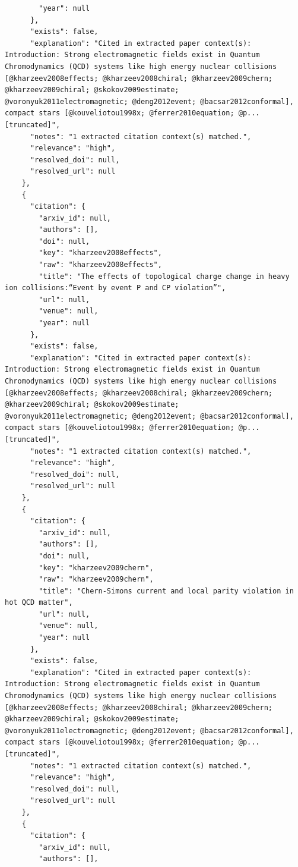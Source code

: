 \documentclass[11pt]{article}
\begin{document}
\begin{verbatim}
        "year": null
      },
      "exists": false,
      "explanation": "Cited in extracted paper context(s): Introduction: Strong electromagnetic fields exist in Quantum Chromodynamics (QCD) systems like high energy nuclear collisions [@kharzeev2008effects; @kharzeev2008chiral; @kharzeev2009chern; @kharzeev2009chiral; @skokov2009estimate; @voronyuk2011electromagnetic; @deng2012event; @bacsar2012conformal], compact stars [@kouveliotou1998x; @ferrer2010equation; @p... [truncated]",
      "notes": "1 extracted citation context(s) matched.",
      "relevance": "high",
      "resolved_doi": null,
      "resolved_url": null
    },
    {
      "citation": {
        "arxiv_id": null,
        "authors": [],
        "doi": null,
        "key": "kharzeev2008effects",
        "raw": "kharzeev2008effects",
        "title": "The effects of topological charge change in heavy ion collisions:“Event by event P and CP violation”",
        "url": null,
        "venue": null,
        "year": null
      },
      "exists": false,
      "explanation": "Cited in extracted paper context(s): Introduction: Strong electromagnetic fields exist in Quantum Chromodynamics (QCD) systems like high energy nuclear collisions [@kharzeev2008effects; @kharzeev2008chiral; @kharzeev2009chern; @kharzeev2009chiral; @skokov2009estimate; @voronyuk2011electromagnetic; @deng2012event; @bacsar2012conformal], compact stars [@kouveliotou1998x; @ferrer2010equation; @p... [truncated]",
      "notes": "1 extracted citation context(s) matched.",
      "relevance": "high",
      "resolved_doi": null,
      "resolved_url": null
    },
    {
      "citation": {
        "arxiv_id": null,
        "authors": [],
        "doi": null,
        "key": "kharzeev2009chern",
        "raw": "kharzeev2009chern",
        "title": "Chern-Simons current and local parity violation in hot QCD matter",
        "url": null,
        "venue": null,
        "year": null
      },
      "exists": false,
      "explanation": "Cited in extracted paper context(s): Introduction: Strong electromagnetic fields exist in Quantum Chromodynamics (QCD) systems like high energy nuclear collisions [@kharzeev2008effects; @kharzeev2008chiral; @kharzeev2009chern; @kharzeev2009chiral; @skokov2009estimate; @voronyuk2011electromagnetic; @deng2012event; @bacsar2012conformal], compact stars [@kouveliotou1998x; @ferrer2010equation; @p... [truncated]",
      "notes": "1 extracted citation context(s) matched.",
      "relevance": "high",
      "resolved_doi": null,
      "resolved_url": null
    },
    {
      "citation": {
        "arxiv_id": null,
        "authors": [],

\end{verbatim}
\end{document}
